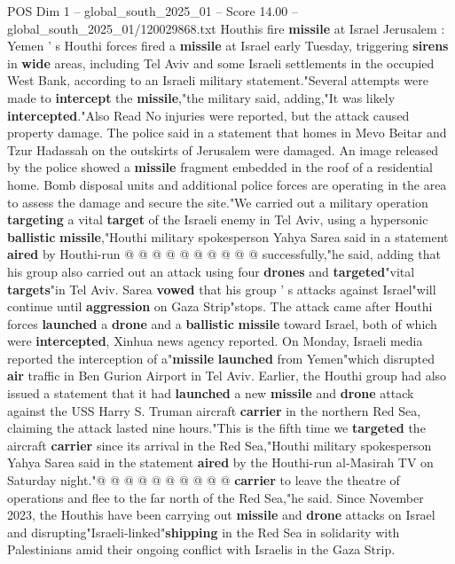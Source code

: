 \begin{textsample}{POS Dim 1 – global\_south\_2025\_01 – Score 14.00 – global\_south\_2025\_01/120029868.txt}  \label{ex:f1_pos_309}
Houthis fire \textbf{missile} at Israel Jerusalem : Yemen ' s Houthi forces fired a \textbf{missile} at Israel early Tuesday, triggering \textbf{sirens} in \textbf{wide} areas, including Tel Aviv and some Israeli settlements in the occupied West Bank, according to an Israeli military statement."Several attempts were made to \textbf{intercept} the \textbf{missile},"the military said, adding,"It was likely \textbf{intercepted}."Also Read No injuries were reported, but the attack caused property damage.
The police said in a statement that homes in Mevo Beitar and Tzur Hadassah on the outskirts of Jerusalem were damaged.
An image released by the police showed a \textbf{missile} fragment embedded in the roof of a residential home.
Bomb disposal units and additional police forces are operating in the area to assess the damage and secure the site."We carried out a military operation \textbf{targeting} a vital \textbf{target} of the Israeli enemy in Tel Aviv, using a hypersonic \textbf{ballistic} \textbf{missile},"Houthi military spokesperson Yahya Sarea said in a statement \textbf{aired} by Houthi-run @ @ @ @ @ @ @ @ @ @ successfully,"he said, adding that his group also carried out an attack using four \textbf{drones} and \textbf{targeted}"vital \textbf{targets}"in Tel Aviv.
Sarea \textbf{vowed} that his group ' s attacks against Israel"will continue until \textbf{aggression} on Gaza Strip"stops.
The attack came after Houthi forces \textbf{launched} a \textbf{drone} and a \textbf{ballistic} \textbf{missile} toward Israel, both of which were \textbf{intercepted}, Xinhua news agency reported.
On Monday, Israeli media reported the interception of a"\textbf{missile} \textbf{launched} from Yemen"which disrupted \textbf{air} traffic in Ben Gurion Airport in Tel Aviv.
Earlier, the Houthi group had also issued a statement that it had \textbf{launched} a new \textbf{missile} and \textbf{drone} attack against the USS Harry S.
Truman aircraft \textbf{carrier} in the northern Red Sea, claiming the attack lasted nine hours."This is the fifth time we \textbf{targeted} the aircraft \textbf{carrier} since its arrival in the Red Sea,"Houthi military spokesperson Yahya Sarea said in the statement \textbf{aired} by the Houthi-run al-Masirah TV on Saturday night."@ @ @ @ @ @ @ @ @ @ \textbf{carrier} to leave the theatre of operations and flee to the far north of the Red Sea,"he said.
Since November 2023, the Houthis have been carrying out \textbf{missile} and \textbf{drone} attacks on Israel and disrupting"Israeli-linked"\textbf{shipping} in the Red Sea in solidarity with Palestinians amid their ongoing conflict with Israelis in the Gaza Strip.

\end{textsample}
